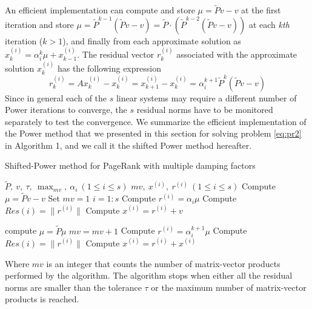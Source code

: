 \documentclass[12pt]{article}
\begin{document}
\noindent An efficient implementation can compute and store $\mu = \tilde Pv -v$ at the first iteration and store $\mu = \tilde P^{k-1}(\tilde P v - v) = \tilde P \cdot (\tilde P^{k-2}(\tilde P v - v))$ at each \emph{kth} iteration ($k  > 1$), and finally from each approximate solution as $x_k^{(i)} = \alpha_i^k \mu + x_{k-1}^{(i)}$. The residual vector $r_k^{(i)}$ associated with the approximate solution $x_k^{(i)}$ has the following expression
\begin{equation}
    r_k^{(i)} = A x_k^{(i)} - x_k^{(i)} = x_{k+1}^{(i)} - x_k^{(i)} = \alpha_i^{k+1} \tilde P^k (\tilde P v - v)
\end{equation}
Since in general each of the $s$ linear systems may require a different number of Power iterations to converge, the $s$ residual norms have to be monitored separately to test the convergence. We summarize the efficient implementation of the Power method that we presented in this section for solving problem \ref{eq:pr2} in Algorithm 1, and we call it the shifted Power method hereafter.

\begin{algorithm}
    \caption{Shifted-Power method for PageRank with multiple damping factors}\label{alg:algo1}
    \begin{algorithmic}
        \Require $\tilde P, ~v, ~\tau, ~\max_{mv}, ~\alpha_i ~ (1 \leq i \leq s)$
        \Ensure $mv,~ x^{(i)},~ r^{(i)} ~ (1 \leq i \leq s)$
        \State Compute $\mu = \tilde P v - v$
        \State Set $mv =1$
        \For $i = 1:s$
            \State Compute $r^{(i)} = \alpha_i \mu$
            \State Compute $Res(i) = \lVert r^{(i)} \rVert$
                \State Compute $x^{(i)} = r^{(i)} + v$
            \EndIf
        \EndFor

            \State compute $\mu = \tilde P \mu$
            \State $mv = mv + 1$
                    \State Compute $r^{(i)} = \alpha_i^{k+1} \mu$
                    \State Compute $Res(i) = \lVert r^{(i)} \rVert$
                        \State Compute $x^{(i)} = r^{(i)} + x^{(i)}$
                    \EndIf
                \EndIf
            \EndFor
        \EndWhile
    \end{algorithmic}
\end{algorithm}

\noindent Where $mv$ is an integer that counts the number of matrix-vector products performed by the algorithm. The algorithm stops when either all the residual norms are smaller than the tolerance $\tau$ or the maximum number of matrix-vector products is reached.



\clearpage


\nocite{*}
\end{document}
